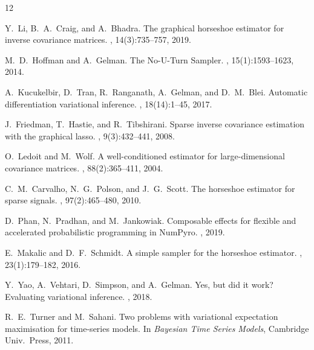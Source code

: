 \documentclass[10pt,conference,compsoc]{IEEEtran}
\begin{document}

\begin{thebibliography}{12}

Y.~Li, B.~A.~Craig, and A.~Bhadra.
\newblock The graphical horseshoe estimator for inverse covariance matrices.
, 14(3):735--757, 2019.

M.~D.~Hoffman and A.~Gelman.
\newblock The No-U-Turn Sampler.
, 15(1):1593--1623, 2014.

A.~Kucukelbir, D.~Tran, R.~Ranganath, A.~Gelman, and D.~M.~Blei.
\newblock Automatic differentiation variational inference.
, 18(14):1--45, 2017.

J.~Friedman, T.~Hastie, and R.~Tibshirani.
\newblock Sparse inverse covariance estimation with the graphical lasso.
, 9(3):432--441, 2008.

O.~Ledoit and M.~Wolf.
\newblock A well-conditioned estimator for large-dimensional covariance matrices.
, 88(2):365--411, 2004.

C.~M.~Carvalho, N.~G.~Polson, and J.~G.~Scott.
\newblock The horseshoe estimator for sparse signals.
, 97(2):465--480, 2010.

D.~Phan, N.~Pradhan, and M.~Jankowiak.
\newblock Composable effects for flexible and accelerated probabilistic programming in NumPyro.
, 2019.

E.~Makalic and D.~F.~Schmidt.
\newblock A simple sampler for the horseshoe estimator.
, 23(1):179--182, 2016.

Y.~Yao, A.~Vehtari, D.~Simpson, and A.~Gelman.
\newblock Yes, but did it work? {E}valuating variational inference.
, 2018.

R.~E.~Turner and M.~Sahani.
\newblock Two problems with variational expectation maximisation for time-series models.
\newblock In {\em Bayesian Time Series Models}, Cambridge Univ.\ Press, 2011.

\end{thebibliography}
\end{document}
